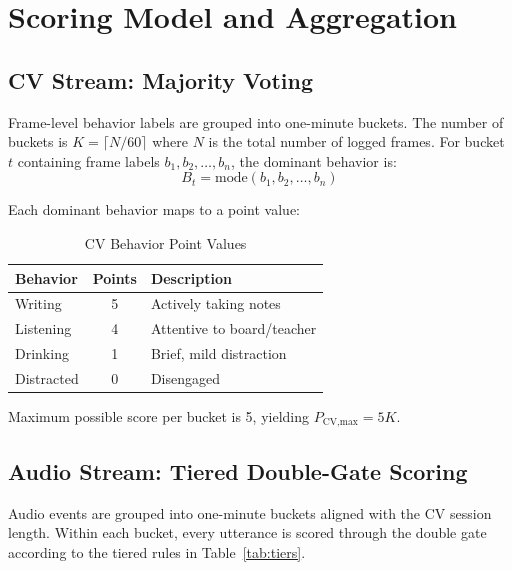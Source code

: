 \documentclass[conference]{IEEEtran}
\begin{document}
\section{Scoring Model and Aggregation}

\subsection{CV Stream: Majority Voting}
Frame-level behavior labels are grouped into one-minute buckets. The number of buckets is $K = \lceil N / 60 \rceil$ where $N$ is the total number of logged frames. For bucket $t$ containing frame labels $b_1, b_2, \ldots, b_n$, the dominant behavior is:
\begin{equation}
B_t = \text{mode}(b_1, b_2, \ldots, b_n)
\label{eq:mode}
\end{equation}

Each dominant behavior maps to a point value:

\begin{table}[htbp]
\caption{CV Behavior Point Values}
\begin{center}
\begin{tabular}{|l|c|l|}
\hline
\textbf{Behavior} & \textbf{Points} & \textbf{Description} \\
\hline
Writing & 5 & Actively taking notes \\
Listening & 4 & Attentive to board/teacher \\
Drinking & 1 & Brief, mild distraction \\
Distracted & 0 & Disengaged \\
\hline
\end{tabular}
\label{tab:cv_points}
\end{center}
\end{table}

Maximum possible score per bucket is 5, yielding $P_{\text{CV,max}} = 5K$.

\subsection{Audio Stream: Tiered Double-Gate Scoring}
Audio events are grouped into one-minute buckets aligned with the CV session length. Within each bucket, every utterance is scored through the double gate according to the tiered rules in Table~\ref{tab:tiers}.
\end{document}
